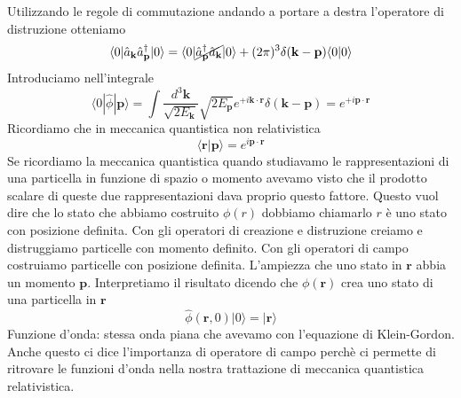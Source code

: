 Utilizzando le regole di commutazione andando a portare a destra l'operatore di distruzione otteniamo
$$
\langle 0 | \hat{a}_\mathbf{k} \hat{a}_\mathbf{p}^\dagger | 0 \rangle = \langle 0 | \cancel{\hat{a}_\mathbf{p}^\dagger \hat{a}_\mathbf{k}} | 0 \rangle + (2\pi)^3 \delta(\mathbf{k} - \mathbf{p}) \langle 0 | 0 \rangle
$$
Introduciamo nell'integrale
$$
\langle 0 | \hat{\phi} | \mathbf{p} \rangle = \int \frac{d^3\mathbf{k}}{\sqrt{2E_\mathbf{k}}} \sqrt{2E_\mathbf{p}} e^{+i\mathbf{k}\cdot\mathbf{r}} \delta(\mathbf{k} - \mathbf{p}) = e^{+i\mathbf{p}\cdot\mathbf{r}}
$$
Ricordiamo che in meccanica quantistica non relativistica
$$
\langle \mathbf{r} | \mathbf{p} \rangle = e^{i\mathbf{p}\cdot\mathbf{r}}
$$
Se ricordiamo la meccanica quantistica quando studiavamo le rappresentazioni di una particella in funzione di spazio o momento avevamo visto che il prodotto scalare di queste due rappresentazioni dava proprio questo fattore. Questo vuol dire che lo stato che abbiamo costruito $\phi(r)$ dobbiamo chiamarlo $r$ è uno stato con posizione definita. Con  gli operatori di creazione e distruzione creiamo e distruggiamo particelle con momento definito. Con gli operatori di campo costruiamo particelle con posizione definita.
L'ampiezza che uno stato in $\mathbf{r}$ abbia un momento $\mathbf{p}$. Interpretiamo il risultato dicendo che $\phi(\mathbf{r})$ crea uno stato di una particella in $\mathbf{r}$
$$
\hat{\phi}(\mathbf{r}, 0) |0\rangle = |\mathbf{r}\rangle
$$
Funzione d'onda: stessa onda piana che avevamo con l'equazione di Klein-Gordon. Anche questo ci dice l'importanza di operatore di campo perchè ci permette di ritrovare le funzioni d'onda nella nostra trattazione di meccanica quantistica relativistica.
